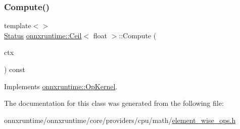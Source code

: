 \subsubsection{\texorpdfstring{Compute()}{Compute()}\hspace{0.1cm}{\footnotesize\ttfamily [2/2]}}
{\footnotesize\ttfamily template$<$$>$ \\
\mbox{\hyperlink{classonnxruntime_1_1common_1_1Status}{Status}} \mbox{\hyperlink{classonnxruntime_1_1Ceil}{onnxruntime\+::\+Ceil}}$<$ float $>$\+::Compute (\begin{DoxyParamCaption}\item[{\mbox{\hyperlink{classonnxruntime_1_1OpKernelContext}{Op\+Kernel\+Context}} $\ast$}]{ctx }\end{DoxyParamCaption}) const\hspace{0.3cm}{\ttfamily [virtual]}}



Implements \mbox{\hyperlink{classonnxruntime_1_1OpKernel_a9eca8656a78b1b3ab9d3351a12798650}{onnxruntime\+::\+Op\+Kernel}}.



The documentation for this class was generated from the following file\+:\begin{DoxyCompactItemize}
\item 
onnxruntime/onnxruntime/core/providers/cpu/math/\mbox{\hyperlink{element__wise__ops_8h}{element\+\_\+wise\+\_\+ops.\+h}}\end{DoxyCompactItemize}

